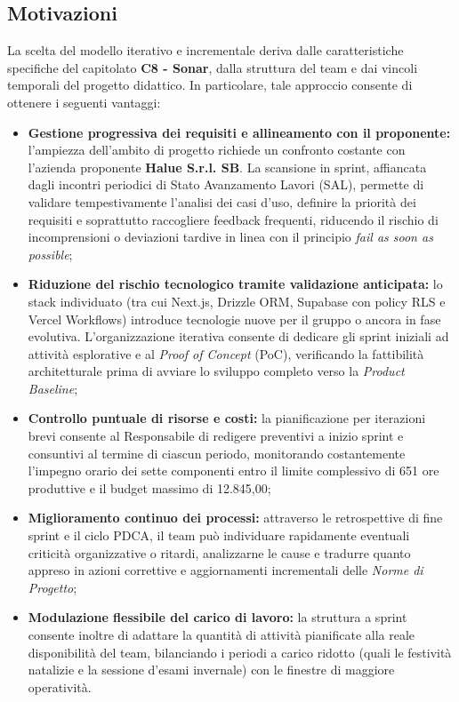 \subsection{Motivazioni}
La scelta del modello iterativo e incrementale deriva dalle caratteristiche specifiche del capitolato \textbf{C8 - Sonar}, dalla struttura del team e dai vincoli temporali del progetto didattico. In particolare, tale approccio consente di ottenere i seguenti vantaggi:
\begin{itemize}
    \item \textbf{Gestione progressiva dei requisiti e allineamento con il proponente:} l'ampiezza dell'ambito di progetto richiede un confronto costante con l'azienda proponente \textbf{Halue S.r.l. SB}. La scansione in sprint, affiancata dagli incontri periodici di Stato Avanzamento Lavori (SAL), permette di validare tempestivamente l'analisi dei casi d'uso, definire la priorità dei requisiti e soprattutto raccogliere feedback frequenti, riducendo il rischio di incomprensioni o deviazioni tardive in linea con il principio \textit{fail as soon as possible};
    \item \textbf{Riduzione del rischio tecnologico tramite validazione anticipata:} lo stack individuato (tra cui Next.js, Drizzle ORM, Supabase con policy RLS e Vercel Workflows) introduce tecnologie nuove per il gruppo o ancora in fase evolutiva. L'organizzazione iterativa consente di dedicare gli sprint iniziali ad attività esplorative e al \textit{Proof of Concept} (PoC), verificando la fattibilità architetturale prima di avviare lo sviluppo completo verso la \textit{Product Baseline};
    \item \textbf{Controllo puntuale di risorse e costi:} la pianificazione per iterazioni brevi consente al Responsabile di redigere preventivi a inizio sprint e consuntivi al termine di ciascun periodo, monitorando costantemente l'impegno orario dei sette componenti entro il limite complessivo di 651 ore produttive e il budget massimo di \texteuro{} 12.845,00;
    \item \textbf{Miglioramento continuo dei processi:} attraverso le retrospettive di fine sprint e il ciclo PDCA, il team può individuare rapidamente eventuali criticità organizzative o ritardi, analizzarne le cause e tradurre quanto appreso in azioni correttive e aggiornamenti incrementali delle \textit{Norme di Progetto};
    \item \textbf{Modulazione flessibile del carico di lavoro:} la struttura a sprint consente inoltre di adattare la quantità di attività pianificate alla reale disponibilità del team, bilanciando i periodi a carico ridotto (quali le festività natalizie e la sessione d'esami invernale) con le finestre di maggiore operatività.
\end{itemize}

